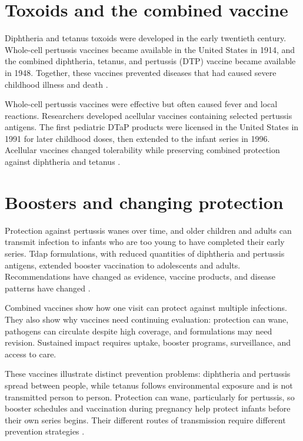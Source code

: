 \documentclass[12pt,oneside]{book}
\begin{document}
\section{Toxoids and the combined vaccine}
Diphtheria and tetanus toxoids were developed in the early twentieth century. Whole-cell pertussis vaccines became available in the United States in 1914, and the combined diphtheria, tetanus, and pertussis (DTP) vaccine became available in 1948. Together, these vaccines prevented diseases that had caused severe childhood illness and death \cite{cdcDTPHistory}.

Whole-cell pertussis vaccines were effective but often caused fever and local
reactions. Researchers developed acellular vaccines containing selected
pertussis antigens. The first pediatric DTaP products were licensed in the
United States in 1991 for later childhood doses, then extended to the infant
series in 1996. Acellular vaccines changed tolerability while preserving
combined protection against diphtheria and tetanus \cite{cdcDTPHistory}.

\section{Boosters and changing protection}
Protection against pertussis wanes over time, and older children and adults can transmit infection to infants who are too young to have completed their early series. Tdap formulations, with reduced quantities of diphtheria and pertussis antigens, extended booster vaccination to adolescents and adults. Recommendations have changed as evidence, vaccine products, and disease patterns have changed \cite{cdcDTPRecommendations}.

Combined vaccines show how one visit can protect against multiple infections.
They also show why vaccines need continuing evaluation: protection can wane,
pathogens can circulate despite high coverage, and formulations may need
revision. Sustained impact requires uptake, booster programs, surveillance,
and access to care.

These vaccines illustrate distinct prevention problems: diphtheria and
pertussis spread between people, while tetanus follows environmental exposure
and is not transmitted person to person. Protection can wane, particularly for
pertussis, so booster schedules and vaccination during pregnancy help protect
infants before their own series begins. Their different routes of transmission
require different prevention strategies
\cite{cdcDTPHistory,cdcDTPRecommendations}.
\end{document}
